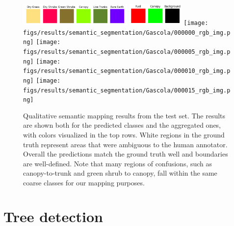 \begin{figure}[h!]
   \centering
   \includegraphics[width=0.5\textwidth]{figs/results/semantic_segmentation/Gascola/safeforest_all_classes_flat.png}
   \includegraphics[width=0.25\textwidth]{figs/results/semantic_segmentation/Gascola/safeforest_classmap_compressed_flat.png}
   \texttt{[image: figs/results/semantic\_segmentation/Gascola/000000\_rgb\_img.png]}
   \vspace{0pt}
   \texttt{[image: figs/results/semantic\_segmentation/Gascola/000005\_rgb\_img.png]}
   \vspace{0pt}
   \texttt{[image: figs/results/semantic\_segmentation/Gascola/000010\_rgb\_img.png]}
   \vspace{0pt}
   \texttt{[image: figs/results/semantic\_segmentation/Gascola/000015\_rgb\_img.png]}
   \vspace{0pt}
   \caption{
   Qualitative semantic mapping results from the test set. The results are shown both for the predicted classes and the aggregated ones, with colors visualized in the top rows.
   White regions in the ground truth represent areas that were ambiguous to the human annotator. Overall the predictions match the ground truth well and boundaries are well-defined. Note that many regions of confusions, such as canopy-to-trunk and green shrub to canopy, fall within the same coarse classes for our mapping purposes.
   }
   \label{fig:results_semantic_seg_qualitative}                %
\end{figure}



\section{Tree detection}


